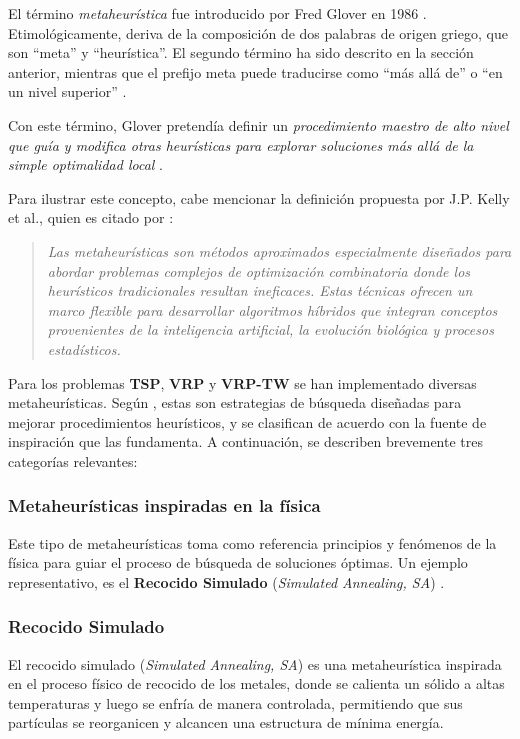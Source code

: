 \documentclass[12pt,titlepage,twoside,openright]{book}
\begin{document}
El término \textit{metaheurística} fue introducido por Fred Glover en 1986 \citep{antonioSuarez2014}. Etimológicamente, deriva de la composición de dos palabras de origen griego, que son “meta” y “heurística”. El segundo término ha sido descrito en la sección anterior, mientras que el prefijo meta puede traducirse como “más allá de” o “en un nivel superior” \citep{duarte2007metaheuristicas}.

Con este término, Glover pretendía definir un \textit{procedimiento maestro de alto nivel que guía y modifica otras heurísticas para explorar soluciones más allá de la simple optimalidad local} \citep{duarte2007metaheuristicas}.

Para ilustrar este concepto, cabe mencionar la definición propuesta por J.P. Kelly et al., quien es citado por \citep{duarte2007metaheuristicas}:

\begin{quote}
	\textit{Las metaheurísticas son métodos aproximados especialmente diseñados para abordar problemas complejos de optimización combinatoria donde los heurísticos tradicionales resultan ineficaces. Estas técnicas ofrecen un marco flexible para desarrollar algoritmos híbridos que integran conceptos provenientes de la inteligencia artificial, la evolución biológica y procesos estadísticos.}
\end{quote}
Para los problemas \textbf{TSP}, \textbf{VRP} y \textbf{VRP-TW} se han implementado diversas metaheurísticas. Según \citep{antonioSuarez2014}, estas son estrategias de búsqueda diseñadas para mejorar procedimientos heurísticos, y se clasifican de acuerdo con la fuente de inspiración que las fundamenta. A continuación, se describen brevemente tres categorías relevantes:

\subsubsection*{Metaheurísticas inspiradas en la física}
Este tipo de metaheurísticas toma como referencia principios y fenómenos de la física para guiar el proceso de búsqueda de soluciones óptimas. Un ejemplo representativo, es el \textbf{Recocido Simulado} (\textit{Simulated Annealing, SA}) \citep{antonioSuarez2014}. 

\subsubsection*{Recocido Simulado} 
El recocido simulado (\textit{Simulated Annealing, SA}) es una metaheurística inspirada en el proceso físico de recocido de los metales, donde se calienta un sólido a altas temperaturas y luego se enfría de manera controlada, permitiendo que sus partículas se reorganicen y alcancen una estructura de mínima energía.
\end{document}
